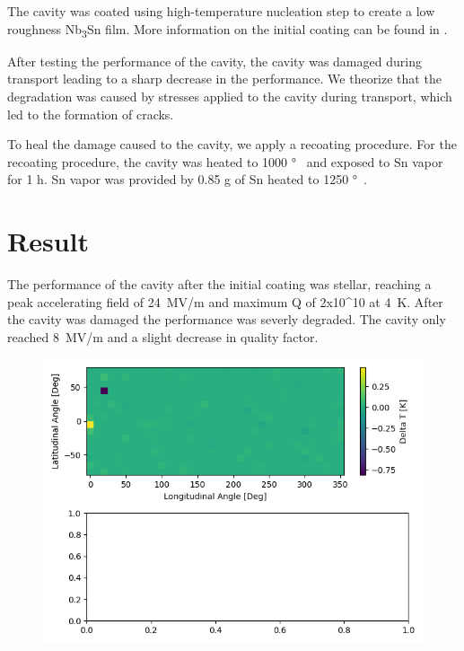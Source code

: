 \documentclass[]{revtex4-2}
\begin{document}
The cavity was coated using high-temperature nucleation step to create a low roughness Nb\textsubscript{3}Sn film. More information on the initial coating can be found in \cite{posen2021advances}. 

After testing the performance of the cavity, the cavity was damaged during transport leading to a sharp decrease in the performance. We theorize that the degradation was caused by stresses applied to the cavity during transport, which led to the formation of cracks.

To heal the damage caused to the cavity, we apply a recoating procedure. For the recoating procedure, the cavity was heated to 1000 \unit{\degree\celcius} and exposed to Sn vapor for 1 \unit{\hour}. Sn vapor was provided by 0.85 \unit{\gram} of Sn heated to 1250 \unit{\degree\celcius}.

\section{Result}
\label{sec:Results}

The performance of the cavity after the initial coating was stellar, reaching a peak accelerating field of 24~MV/m and maximum Q of 2x10^10 at 4~K. After the cavity was damaged the performance was severly degraded. The cavity only reached 8~MV/m and a slight decrease in quality factor.

\begin{figure}[htb]%
    \centering%
    \includegraphics[width=1.0\columnwidth]{./figures/TMAP.png}%
    \caption{}%
    \label{fig:VTS}%
\end{figure}
\end{document}
